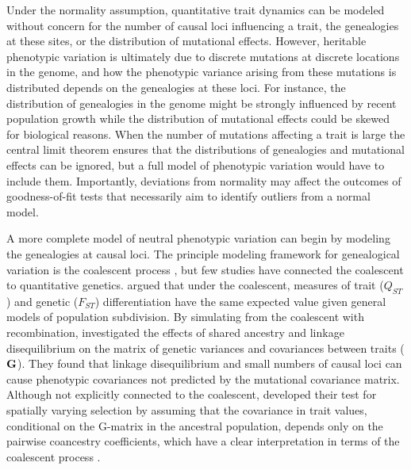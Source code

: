Under the normality assumption, quantitative trait dynamics can be modeled
without concern for the number of causal loci influencing a trait, the
genealogies at these sites, or the distribution of mutational effects. However,
heritable phenotypic variation is ultimately due to discrete mutations at
discrete locations in the genome, and how the phenotypic variance arising from
these mutations is distributed depends on the genealogies at these loci. For
instance, the distribution of genealogies in the genome might be strongly
influenced by recent population growth while the distribution of mutational
effects could be skewed for biological reasons. When the number of mutations
affecting a trait is large the central limit theorem ensures that the
distributions of genealogies and mutational effects can be ignored, but a full
model of phenotypic variation would have to include them. Importantly,
deviations from normality may affect the outcomes of goodness-of-fit tests that
necessarily aim to identify outliers from a normal model.

A more complete model of neutral phenotypic variation can begin by modeling the
genealogies at causal loci. The principle modeling framework for genealogical
variation is the coalescent process \citep{Wakeley2008}, but few studies have
connected the coalescent to quantitative genetics. \citet{Whitlock1999} argued
that under the coalescent, measures of trait ($Q_{ST}$) and genetic ($F_{ST}$)
differentiation have the same expected value given general models of population
subdivision. By simulating from the coalescent with recombination,
\citet{Griswold2007} investigated the effects of shared ancestry and linkage
disequilibrium on the matrix of genetic variances and covariances between traits
($\mbox{\textbf{G}}$). They found that linkage disequilibrium and small numbers
of causal loci can cause phenotypic covariances not predicted by the mutational
covariance matrix. Although not explicitly connected to the coalescent,
\citet{Ovaskainen2011} developed their test for spatially varying selection by
assuming that the covariance in trait values, conditional on the G-matrix in the
ancestral population, depends only on the pairwise coancestry coefficients,
which have a clear interpretation in terms of the coalescent process
\citep{Slatkin1991}.

